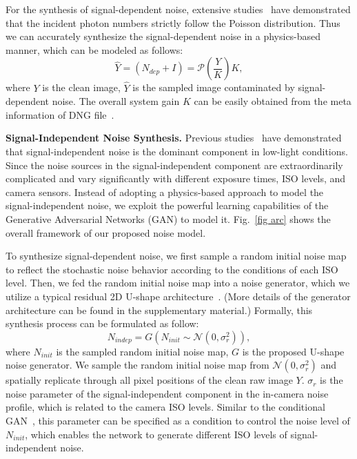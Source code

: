 \documentclass[10pt,twocolumn,letterpaper]{article}
\begin{document}
For the synthesis of signal-dependent noise, extensive studies~\cite{wei2020physics,zhang2021rethinking} have demonstrated that the incident photon numbers strictly follow the Poisson distribution. Thus we can accurately synthesize the signal-dependent noise in a physics-based manner, which can be modeled as follows:
\begin{equation}
    \hat{Y}=({N_{dep}}+I) = \mathcal{P}(\frac{Y}{K})K ,  
\end{equation}
\noindent where $Y$ is the clean image, $\hat{Y}$ is the sampled image contaminated by signal-dependent noise. The overall system gain $K$ can be easily obtained from the meta information of DNG file~\cite{adobe2012}.

\textbf{Signal-Independent Noise Synthesis.} Previous studies~\cite{wei2020physics, zhang2021rethinking} have demonstrated that signal-independent noise is the dominant component in low-light conditions. Since the noise sources in the signal-independent component are extraordinarily complicated and vary significantly with different exposure times, ISO levels, and camera sensors. Instead of adopting a physics-based approach to model the signal-independent noise, we exploit the powerful learning capabilities of the Generative Adversarial Networks (GAN) to model it. Fig.~\ref{fig arc} shows the overall framework of our proposed noise model.

To synthesize signal-dependent noise, we first sample a random initial noise map to reflect the stochastic noise behavior according to the conditions of each ISO level. Then, we fed the random initial noise map into a noise generator, which we utilize a typical residual 2D U-shape architecture~\cite{ronneberger2015u}. (More details of the generator architecture can be found in the supplementary material.) Formally, this synthesis process can be formulated as follow:
\begin{equation}
    N_{indep} = G(N_{init} \sim \mathcal{N}(0,\sigma_{r}^{2})) ,
\end{equation}
\noindent where $N_{init}$ is the sampled random initial noise map, $G$ is the proposed U-shape noise generator. We sample the random initial noise map from $\mathcal{N}(0,\sigma_{r}^{2})$ and spatially replicate through all pixel positions of the clean raw image $Y$. $\sigma_{r}$ is the noise parameter of the signal-independent component in the in-camera noise profile, which is related to the camera ISO levels. Similar to the conditional GAN~\cite{mirza2014conditional}, this parameter can be specified as a condition to control the noise level of $N_{init}$, which enables the network to generate different ISO levels of signal-independent noise.
\end{document}
